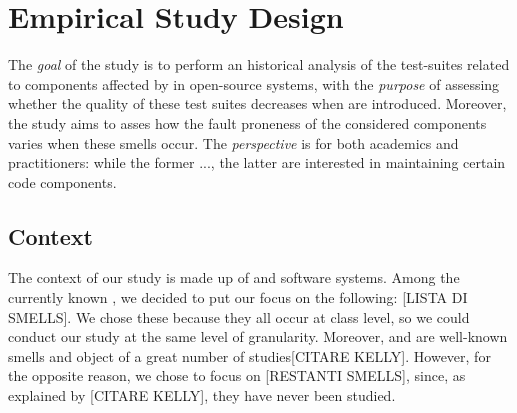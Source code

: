\section{Empirical Study Design}\label{sec:design}
The \textit{goal} of the study is to perform an historical analysis of the test-suites related to components affected by \asmells in open-source systems, with the \textit{purpose} of assessing whether the quality of these test suites decreases when \asmells are introduced.
Moreover, the study aims to asses how the fault proneness of the considered components varies when these smells occur.
The \textit{perspective} is for both academics and practitioners: while the former ..., the latter are interested in maintaining certain code components. 

\subsection{Context}
The context of our study is made up of \asmells and software systems.
Among the currently known \asmells, we decided to put our focus on the following: [LISTA DI SMELLS].
We chose these because they all occur at class level, so we could conduct our study at the same level of granularity.
Moreover, \cyclic and \hublike are well-known smells and object of a great number of studies[CITARE KELLY].
However, for the opposite reason, we chose to focus on [RESTANTI SMELLS], since, as explained by [CITARE KELLY], they have never been studied.